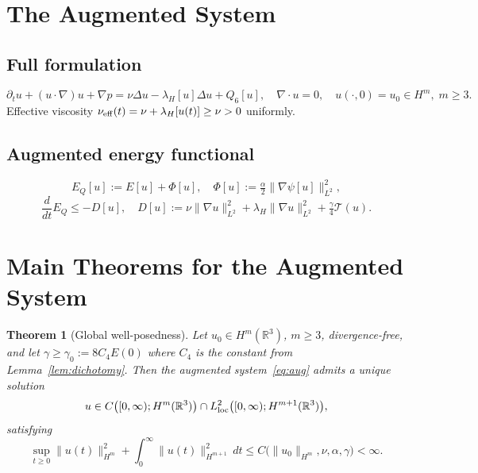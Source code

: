 \documentclass[12pt]{amsart}
\newtheorem{theorem}{Theorem}[section]
\theoremstyle{remark}
\newcommand{\R}{\mathbb{R}}
\newcommand{\Tcal}{\mathcal{T}}
\newcommand{\lH}{\lambda_H}
\newcommand{\Qsix}{Q_6}
\begin{document}
\section{The Augmented System}
\label{sec:augmented}

\subsection{Full formulation}
\begin{equation}\label{eq:aug}
  \partial_t u+(u\cdot\nabla)u+\nabla p
  =\nu\Delta u-\lH[u]\Delta u+\Qsix[u],
  \quad\nabla\cdot u=0,\quad u(\cdot,0)=u_0\in H^m,\;m\ge 3.
\end{equation}
Effective viscosity $\nu_{\rm eff}(t)=\nu+\lH[u(t)]\ge\nu>0$ uniformly.

\subsection{Augmented energy functional}
\begin{equation}\label{eq:EQ}
  E_Q[u]:=E[u]+\Phi[u],\quad\Phi[u]:=\tfrac{\alpha}{2}\|\nabla\psi[u]\|_{L^2}^2,
\end{equation}
\[
  \frac{d}{dt}E_Q\le-D[u],\quad
  D[u]:=\nu\|\nabla u\|_{L^2}^2+\lH\|\nabla u\|_{L^2}^2
  +\tfrac{\gamma}{4}\Tcal(u).
\]

\section{Main Theorems for the Augmented System}
\label{sec:main}

\begin{theorem}[Global well-posedness]\label{thm:gwp}
Let $u_0\in H^m(\R^3)$, $m\ge 3$, divergence-free, and let
$\gamma\ge\gamma_0:=8C_4E(0)$ where $C_4$ is the constant from
Lemma~\ref{lem:dichotomy}.  Then the augmented system~\eqref{eq:aug}
admits a unique solution
\[
  u\in C\bigl([0,\infty);H^m(\R^3)\bigr)
  \cap L^2_{\rm loc}\bigl([0,\infty);H^{m+1}(\R^3)\bigr),
\]
satisfying
\[
  \sup_{t\ge 0}\|u(t)\|_{H^m}^2
  +\int_0^\infty\|u(t)\|_{H^{m+1}}^2\,dt
  \le C\bigl(\|u_0\|_{H^m},\nu,\alpha,\gamma\bigr)<\infty.
\]
\end{theorem}
\end{document}
